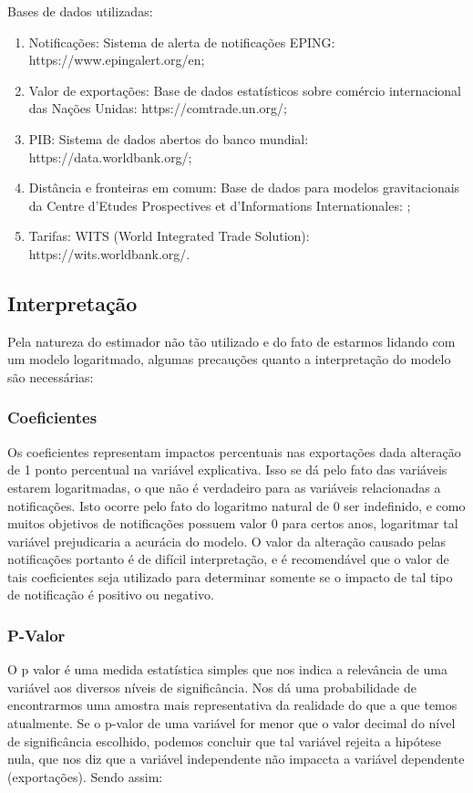 \documentclass[12pt, a4paper]{article}
\begin{document}
Bases de dados utilizadas:

\begin{enumerate}
    \item Notificações: Sistema de alerta de notificações EPING: https://www.epingalert.org/en;
    \item Valor de exportações: Base de dados estatísticos sobre comércio internacional das Nações Unidas: https://comtrade.un.org/;
    \item PIB: Sistema de dados abertos do banco mundial: https://data.worldbank.org/;
    \item Distância e fronteiras em comum: Base de dados para modelos gravitacionais da Centre d'Etudes Prospectives et d'Informations Internationales: \cite{CEPII};
    \item Tarifas: WITS (World Integrated Trade Solution): https://wits.worldbank.org/.
\end{enumerate}

\subsection{Interpretação}

Pela natureza do estimador não tão utilizado e do fato de estarmos lidando com um modelo logaritmado, algumas precauções quanto a interpretação do modelo são necessárias:

\subsubsection{Coeficientes}

Os coeficientes representam impactos percentuais nas exportações dada alteração de 1 ponto percentual na variável explicativa. Isso se dá pelo fato das variáveis estarem logaritmadas, o que não é verdadeiro para as variáveis relacionadas a notificações. Isto ocorre pelo fato do logaritmo natural de 0 ser indefinido, e como muitos objetivos de notificações possuem valor 0 para certos anos, logaritmar tal variável prejudicaria a acurácia do modelo. O valor da alteração causado pelas notificações portanto é de difícil interpretação, e é recomendável que o valor de tais coeficientes seja utilizado para determinar somente se o impacto de tal tipo de notificação é positivo ou negativo.

\subsubsection{P-Valor}
O p valor é uma medida estatística simples que nos indica a relevância de uma variável aos diversos níveis de significância. Nos dá uma probabilidade de encontrarmos uma amostra mais representativa da realidade do que a que temos atualmente. Se o p-valor de uma variável for menor que o valor decimal do nível de significância escolhido, podemos concluir que tal variável rejeita a hipótese nula, que nos diz que a variável independente não impaccta a variável dependente (exportações). Sendo assim:
\end{document}
